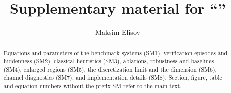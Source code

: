 \documentclass[preprint,12pt]{elsarticle}
\begin{document}
\begin{frontmatter}
\title{Supplementary material for ``\papertitle''}
\author{Maksim Elisov}
\begin{abstract}
Equations and parameters of the benchmark systems (SM1), verification episodes and hiddenness (SM2), classical heuristics (SM3), ablations, robustness and baselines (SM4), enlarged regions (SM5), the discretization limit and the dimension (SM6), channel diagnostics (SM7), and implementation details (SM8). Section, figure, table and equation numbers without the prefix SM refer to the main text.
\end{abstract}
\end{frontmatter}












\end{document}
